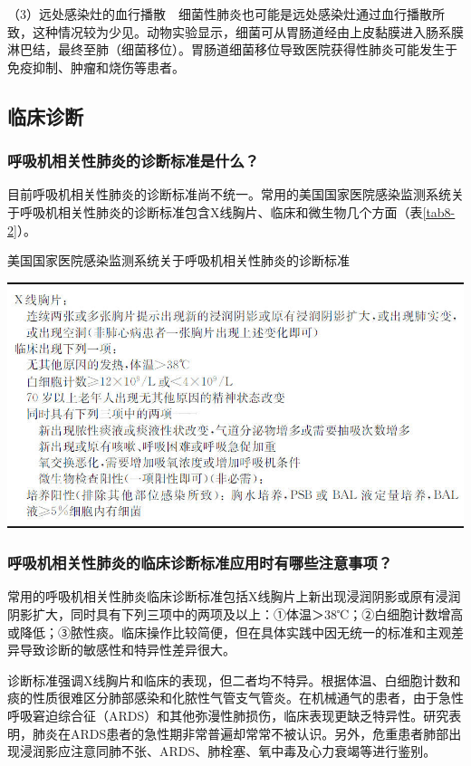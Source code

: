 （3）远处感染灶的血行播散　细菌性肺炎也可能是远处感染灶通过血行播散所致，这种情况较为少见。动物实验显示，细菌可从胃肠道经由上皮黏膜进入肠系膜淋巴结，最终至肺（细菌移位）。胃肠道细菌移位导致医院获得性肺炎可能发生于免疫抑制、肿瘤和烧伤等患者。

\subsection{临床诊断}

\subsubsection{呼吸机相关性肺炎的诊断标准是什么？}

目前呼吸机相关性肺炎的诊断标准尚不统一。常用的美国国家医院感染监测系统关于呼吸机相关性肺炎的诊断标准包含X线胸片、临床和微生物几个方面（表\ref{tab8-2}）。

\begin{table}[htbp]
\centering
\caption{美国国家医院感染监测系统关于呼吸机相关性肺炎的诊断标准}
\label{tab8-2}
\includegraphics{./images/Image00060.jpg}
\end{table}

\subsubsection{呼吸机相关性肺炎的临床诊断标准应用时有哪些注意事项？}

常用的呼吸机相关性肺炎临床诊断标准包括X线胸片上新出现浸润阴影或原有浸润阴影扩大，同时具有下列三项中的两项及以上：①体温＞38℃；②白细胞计数增高或降低；③脓性痰。临床操作比较简便，但在具体实践中因无统一的标准和主观差异导致诊断的敏感性和特异性差异很大。

诊断标准强调X线胸片和临床的表现，但二者均不特异。根据体温、白细胞计数和痰的性质很难区分肺部感染和化脓性气管支气管炎。在机械通气的患者，由于急性呼吸窘迫综合征（ARDS）和其他弥漫性肺损伤，临床表现更缺乏特异性。研究表明，肺炎在ARDS患者的急性期非常普遍却常常不被认识。另外，危重患者肺部出现浸润影应注意同肺不张、ARDS、肺栓塞、氧中毒及心力衰竭等进行鉴别。


